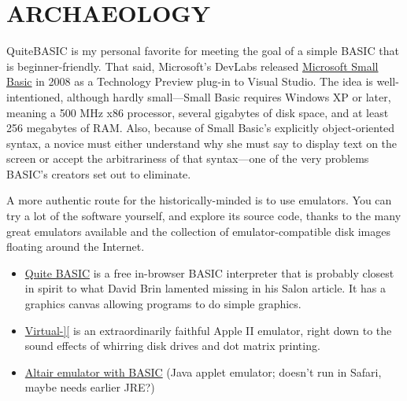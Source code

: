 
\section{ARCHAEOLOGY}


QuiteBASIC is my personal favorite for meeting the goal of a simple
BASIC that is beginner-friendly.  That said,
Microsoft's DevLabs 
released \href{http://smallbasic.com}{Microsoft Small Basic} in 2008 as a
Technology Preview plug-in to Visual Studio.
The idea is well-intentioned, although hardly small---Small Basic
requires Windows XP or later, meaning a 500
MHz x86 processor, several gigabytes of disk space, and at least 256
megabytes of RAM.
Also, because of Small Basic's explicitly
object-oriented syntax,  a novice must either understand why she
must say  to display text on the
screen or accept the arbitrariness of that syntax---one of the very problems
BASIC's creators set out to eliminate.  

A more authentic route for the historically-minded is to use emulators.
You can try a lot of the software yourself, and explore
its source code, thanks to the many great emulators available and the
collection of emulator-compatible disk images floating around the Internet.

\begin{itemize}

\item \href{http://quitebasic.com}{Quite BASIC} is a free in-browser BASIC
  interpreter that is probably closest in spirit to what David Brin
  lamented missing in his Salon article.  It has a graphics canvas
  allowing programs to do simple graphics.

\item \href{http://virtualii.com}{Virtual-][} is an extraordinarily
  faithful Apple II emulator, right down to the sound effects of
  whirring disk drives and dot matrix printing.

\item \href{http://web.archive.org/web/20011211231432/http://www.rjh.org.uk/altair/4k/em/altem.htm}{Altair emulator with BASIC} (Java applet emulator; doesn't run in Safari,
maybe needs earlier JRE?)

\end{itemize}




